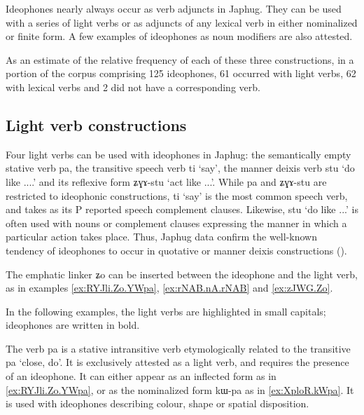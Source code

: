 \documentclass[oldfontcommands,oneside,a4paper,11pt]{article}
\newcommand{\ipa}[1]{{\phon \mbox{#1}}} %
\begin{document}
Ideophones nearly always occur as verb adjuncts in Japhug. They can be used with a series of light verbs or as adjuncts of any lexical verb in either nominalized or finite form. A few examples of ideophones as noun modifiers are also attested.

As an estimate of the relative frequency of each of these three constructions, in a portion of the corpus comprising 125 ideophones, 61 occurred with light verbs, 62 with lexical verbs and 2 did not have a corresponding verb.

\subsection{Light verb constructions} \label{sec:ideophone.plus.light.verb}
 
Four light verbs can be used with ideophones in Japhug: the semantically empty stative verb \ipa{pa}, the transitive speech verb \ipa{ti} `say', the manner deixis verb \ipa{stu} `do like ....' and its reflexive form \ipa{ʑɣɤ-stu} `act like ...'.   While \ipa{pa} and \ipa{ʑɣɤ-stu} are restricted to ideophonic constructions, \ipa{ti} `say'  is the most common speech verb, and takes as its P reported speech complement clauses. Likewise,  \ipa{stu} `do like ...' is often used with nouns or complement clauses expressing the manner in which a particular action takes place. Thus, Japhug data confirm the  well-known tendency of ideophones to occur in quotative or manner deixis constructions (\citet[280-8]{guldemann08quot}).



The emphatic linker \ipa{ʑo} can be inserted between the ideophone and the light verb, as in examples \ref{ex:RYJli.Zo.YWpa}, \ref{ex:rNAB.nA.rNAB} and \ref{ex:zJWG.Zo}.  

In the following examples, the light verbs are highlighted   in small capitals; ideophones are written in bold.

The verb \ipa{pa} is a stative intransitive verb etymologically related to the transitive \ipa{pa} `close, do'. It is exclusively attested as a light verb, and requires the presence of an ideophone.  It can either appear as an inflected form as in \ref{ex:RYJli.Zo.YWpa}, or as the nominalized form \ipa{kɯ-pa} as in \ref{ex:XploR.kWpa}. It is used with ideophones describing   colour, shape or spatial disposition.
 
\end{document}
